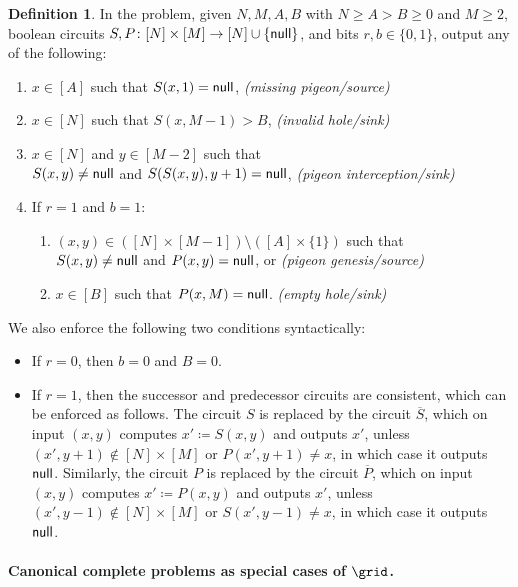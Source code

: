 \documentclass[10pt,a4paper]{article}
\theoremstyle{definition}
\newtheorem{definition}{Definition}
\theoremstyle{plain}
\theoremstyle{remark}
\newcommand{\nul}{\textup{\textsf{null}}}
\begin{document}
\begin{definition}\label{definition:grid_problem}
In the \grid problem, given $N,M,A,B$ with $N \geq A > B \geq 0$ and $M \geq 2$, boolean circuits $S, P \colon [N] \times [M] \to [N] \cup \{\nul\}$, and bits $r,b \in \{0,1\}$, output any of the following:
\begin{enumerate}
    \item $x \in [A]$ such that $S(x,1) = \nul$, \hfill \emph{(missing pigeon/source)}
    \item $x \in [N]$ such that $S(x,M-1) > B$, \hfill \emph{(invalid hole/sink)}
    \item $x \in [N]$ and $y \in [M-2]$ such that\\
    $S(x,y) \neq \nul$ and $S(S(x,y),y+1) = \nul$, \hfill \emph{(pigeon interception/sink)}
    \item If $r=1$ and $b=1$:
    \begin{enumerate}
        \item $(x,y) \in ([N] \times [M-1]) \setminus ([A] \times \{1\})$ such that\\
        $S(x,y) \neq \nul$ and $P(x,y) = \nul$, or \hfill \emph{(pigeon genesis/source)}
        \item $x \in [B]$ such that $P(x,M) = \nul$. \hfill \emph{(empty hole/sink)}
    \end{enumerate}
\end{enumerate}
We also enforce the following two conditions syntactically:
\begin{itemize}
    \item If $r=0$, then $b=0$ and $B=0$.
    \item If $r=1$, then the successor and predecessor circuits are consistent, which can be enforced as follows. The circuit $S$ is replaced by the circuit $\overline{S}$, which on input $(x,y)$ computes $x ' \coloneqq S(x,y)$ and outputs $x'$, unless $(x',y+1) \notin [N] \times [M]$ or $P(x',y+1) \neq x$, in which case it outputs $\nul$. Similarly, the circuit $P$ is replaced by the circuit $\overline{P}$, which on input $(x,y)$ computes $x ' \coloneqq P(x,y)$ and outputs $x'$, unless $(x',y-1) \notin [N] \times [M]$ or $S(x',y-1) \neq x$, in which case it outputs $\nul$.
\end{itemize}
\end{definition}


\paragraph{Canonical complete problems as special cases of $\grid$.}
\end{document}
